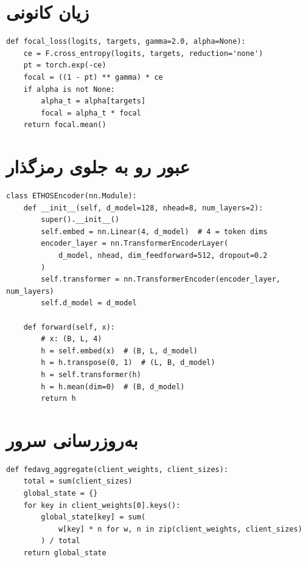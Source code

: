 \section{زیان کانونی}

\begin{latin}\begin{lstlisting}[caption={\rl{پیاده‌سازی \lr{Focal Loss}}}]
def focal_loss(logits, targets, gamma=2.0, alpha=None):
    ce = F.cross_entropy(logits, targets, reduction='none')
    pt = torch.exp(-ce)
    focal = ((1 - pt) ** gamma) * ce
    if alpha is not None:
        alpha_t = alpha[targets]
        focal = alpha_t * focal
    return focal.mean()
\end{lstlisting}\end{latin}

\section{عبور رو به جلوی رمزگذار }

\begin{latin}\begin{lstlisting}[caption={\rl{رمزگذار \lr{ETHOS} (ساده‌شده)}}]
class ETHOSEncoder(nn.Module):
    def __init__(self, d_model=128, nhead=8, num_layers=2):
        super().__init__()
        self.embed = nn.Linear(4, d_model)  # 4 = token dims
        encoder_layer = nn.TransformerEncoderLayer(
            d_model, nhead, dim_feedforward=512, dropout=0.2
        )
        self.transformer = nn.TransformerEncoder(encoder_layer, num_layers)
        self.d_model = d_model

    def forward(self, x):
        # x: (B, L, 4)
        h = self.embed(x)  # (B, L, d_model)
        h = h.transpose(0, 1)  # (L, B, d_model)
        h = self.transformer(h)
        h = h.mean(dim=0)  # (B, d_model)
        return h
\end{lstlisting}\end{latin}

\section{به‌روزرسانی سرور }

\begin{latin}\begin{lstlisting}[caption={\rl{تجمیع \lr{FedAvg}}}]
def fedavg_aggregate(client_weights, client_sizes):
    total = sum(client_sizes)
    global_state = {}
    for key in client_weights[0].keys():
        global_state[key] = sum(
            w[key] * n for w, n in zip(client_weights, client_sizes)
        ) / total
    return global_state
\end{lstlisting}\end{latin}
